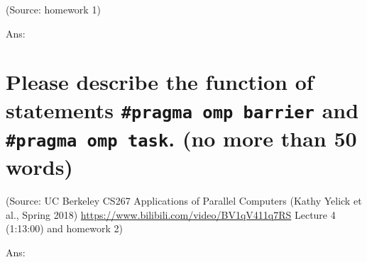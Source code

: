 \documentclass[UTF8]{article}
\begin{document}
(Source: homework 1)

Ans:%
~\\
\section{Please describe the function of statements \texttt{\#pragma omp barrier} and \texttt{\#pragma omp task}. (no more than 50 words)}
(Source: UC Berkeley CS267 Applications of Parallel Computers (Kathy Yelick et al., Spring 2018) \url{https://www.bilibili.com/video/BV1qV411q7RS} Lecture 4 (1:13:00) and homework 2)

Ans:%
~\\

\end{document}
